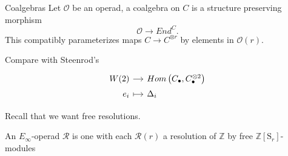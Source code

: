 \documentclass[10pt,t]{beamer} %
\renewcommand{\S}{\mathrm{S}}
\begin{document}
\begin{frame}[fragile]{Coalgebras}
	Let $\mathcal O$ be an operad, a coalgebra on $C$ is a structure preserving morphism
	\begin{equation*}
	\mathcal O \to End^C.
	\end{equation*}
	This compatibly parameterizes maps $C \to C^{\otimes r}$ by elements in $\mathcal O(r)$.
	
	\pause \vspace*{10pt}
	
	Compare with Steenrod's
	\vspace*{-2pt}
	\begin{equation*}
	\begin{tikzcd}[%
	row sep=tiny,
	column sep = small,
	,row sep = 0ex
	,/tikz/column 1/.append style={anchor=base east}
	,/tikz/column 2/.append style={anchor=base west}
	]
	W(2) \arrow[r] & Hom\left(C_\bullet, C_\bullet^{\otimes 2}\right) \\
	e_i \arrow[r, |->] & \Delta_i
	\end{tikzcd}
	\end{equation*}
	
	\pause
	Recall that we want free resolutions.

	\pause

	\begin{definition}
		An $E_\infty$-operad $\mathcal R$ is one with each $\mathcal R(r)$ a resolution of $\mathbb Z$ by free $\mathbb Z[\S_r]$-modules
	\end{definition}
\end{frame}
\end{document}
